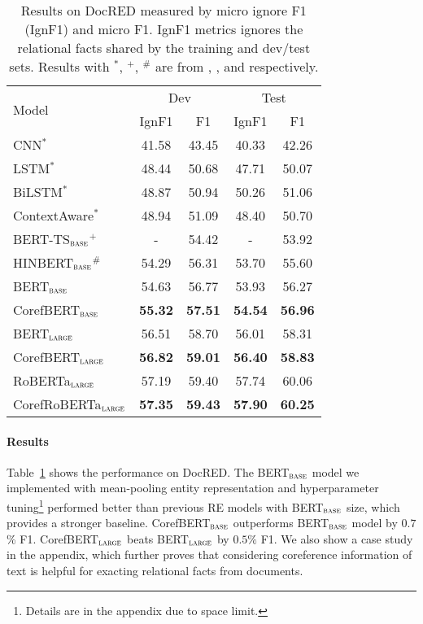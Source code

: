 \documentclass[11pt,a4paper]{article}
\newcommand\BASESIZE{$_{\small \textsc{base}}$\xspace}
\newcommand\LARGESIZE{$_{\small \textsc{large}}$\xspace}
\begin{document}
\begin{table}[!t]
\small
\centering
\begin{tabular}{l c c c c}
\toprule

\multirow{2}{*}{Model}   &\multicolumn{2}{c}{Dev}   &  \multicolumn{2}{c}{Test}  \\
                        &  IgnF1        & F1            & IgnF1        & F1 \\
\midrule
CNN$^*$ & 41.58 &  43.45 &  40.33 &  42.26 \\
LSTM$^*$ & 48.44 &50.68 & 47.71 & 50.07\\
BiLSTM$^*$ & {48.87}  & 50.94 & 50.26 & 51.06 \\
ContextAware$^*$ & 48.94 & 51.09 & 48.40  & 50.70 \\  
\midrule
BERT-TS\BASESIZE $^+$  & - & 54.42 & -& 53.92\\
HINBERT\BASESIZE $^{\#}$ & 54.29 &56.31 & 53.70 & 55.60 \\
BERT\BASESIZE  &54.63 & 56.77 & 53.93 & 56.27 \\
CorefBERT\BASESIZE & \bf{55.32} & \bf{57.51} & \bf{54.54} & \bf{56.96} \\
\midrule
BERT\LARGESIZE  & 56.51 & 58.70 & 56.01 & 58.31 \\
CorefBERT\LARGESIZE & \bf{56.82} & \bf{59.01} & \bf{56.40} & \bf{58.83} \\
\midrule
RoBERTa\LARGESIZE & 57.19 & {59.40} & 57.74 & 60.06\\
CorefRoBERTa\LARGESIZE & \bf{57.35} & \bf{59.43} & \bf{57.90} & \bf{60.25} \\
\bottomrule
\end{tabular}
\caption{Results on DocRED measured by micro ignore F1 (IgnF1) and micro F1. IgnF1 metrics ignores the relational facts shared by the training and dev/test sets. Results with $^*$, $^+$, $^{\#}$ are from \citet{DocRED}, \citet{DocREDBert}, and \citet{HinBERT} respectively.}
\label{tab:DocRED_result}
\end{table}

\vspace{-0.1em}
\paragraph{Results} Table~\ref{tab:DocRED_result} shows the performance on DocRED. The BERT\BASESIZE model we implemented with mean-pooling entity representation and hyperparameter tuning\footnote{Details are in the appendix due to space limit.}  performed better than previous RE models with BERT\BASESIZE size, which provides a stronger baseline. CorefBERT\BASESIZE outperforms BERT\BASESIZE model by $0.7$\% F1. CorefBERT\LARGESIZE beats BERT\LARGESIZE by $0.5\%$ F1. 
We also show a case study in the appendix, which further proves that considering coreference information of text is helpful for exacting relational facts from documents.
\end{document}
